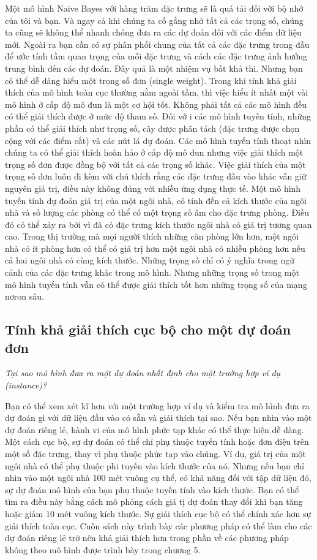 Một mô hình Naive Bayes với hàng trăm đặc trưng sẽ là quá tải đối với bộ nhớ của tôi và bạn. Và ngay cả khi chúng ta cố gắng nhớ tất cả các trọng số, chúng ta cũng sẽ không thể nhanh chóng đưa ra các dự đoán đối với các điểm dữ liệu mới. Ngoài ra bạn cần có sự phân phối chung của tất cả các đặc trưng trong đầu để ước tính tầm quan trọng của mỗi đặc trưng và cách các đặc trưng ảnh hưởng trung bình đến các dự đoán. Đây quả là một nhiệm vụ bất khả thi. Nhưng bạn có thể dễ dàng hiểu một trọng số đơn (single weight). Trong khi tính khả giải thích của mô hình toàn cục thường nằm ngoài tầm, thì việc hiểu ít nhất một vài mô hình ở cấp độ mô đun là một cơ hội tốt. Không phải tất cả các mô hình đều có thể giải thích được ở mức độ tham số. Đối vớ i các mô hình tuyến tính, những phần có thể giải thích như trọng số, cây được phân tách (đặc trưng được chọn cộng với các điểm cắt) và các nút lá dự đoán. Các mô hình tuyến tính thoạt nhìn chúng ta có thể giải thích hoàn hảo ở cấp độ mô dun nhưng việc giải thích một trọng số đơn được đồng bộ với tất cả các trọng số khác. Việc giải thích của một trọng số đơn luôn đi kèm với chú thích rằng các đặc trưng đầu vào khác vẫn giữ nguyên giá trị, điều này không đúng với nhiều ứng dụng thực tế. Một mô hình tuyến tính dự đoán giá trị của một ngôi nhà, có tính đến cả kích thước của ngôi nhà và số lượng các phòng có thể có một trọng số âm cho đặc trưng phòng. Điều đó có thể xảy ra bởi vì đã có đặc trưng kích thước ngôi nhà có giá trị tương quan cao. Trong thị trường mà mọi người thích những căn phòng lớn hơn, một ngôi nhà có ít phòng hơn có thể có giá trị hơn một ngôi nhà có nhiều phòng hơn nếu cả hai ngôi nhà có cùng kích thước. Những trọng số chỉ có ý nghĩa trong ngữ cảnh của các đặc trưng khác trong mô hình. Nhưng những trọng số trong một mô hình tuyến tính vẫn có thể được giải thích tốt hơn những trọng số của mạng nơron sâu. 
\subsection{Tính khả giải thích cục bộ cho một dự đoán đơn}
\textit{Tại sao mô hình đưa ra một dự đoán nhất định cho một trường hợp ví dụ (instance)?}

Bạn có thể xem xét kĩ hơn với một trường hợp ví dụ và kiểm tra mô hình đưa ra dự đoán gì với dữ liệu đầu vào có sẵn và giải thích tại sao. Nếu bạn nhìn vào một dự đoán riêng lẻ, hành vi của mô hình phức tạp khác có thể thực hiện dễ dàng. Một cách cục bộ, sự dự đoán có thể chỉ phụ thuộc tuyến tính hoặc đơn điệu trên một số đặc trưng, thay vì phụ thuộc phức tạp vào chúng. Ví dụ, giá trị của một ngôi nhà có thể phụ thuộc phi tuyến vào kích thước của nó. Nhưng nếu bạn chỉ nhìn vào một ngôi nhà 100 mét vuông  cụ thể, có khả năng đối với tập dữ liệu đó, sự dự đoán mô hình của bạn phụ thuộc tuyến tính vào kích thước. Bạn có thể tìm ra điều này bằng cách mô phỏng cách giá tị dự đoán thay đổi khi bạn tăng hoặc giảm 10 mét vuông kích thước. Sự giải thích cục bộ có thể chính xác hơn sự giải thích toàn cục. Cuốn sách này trình bày các phương pháp có thể làm cho các dự đoán riêng lẻ trở nên khả giải thích hơn trong phần về các phương pháp không theo mô hình được trình bày trong chương 5.


